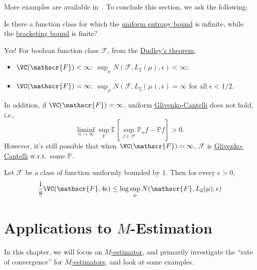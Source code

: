 More examples are available in~\cite{vandervaartWeakConvergenceEmpirical1996}. To conclude this section, we ask the following:

\begin{problem}
Is there a function class for which the \hyperref[thm:uniform-entropy-integral-bound]{uniform entropy bound} is infinite, while the \hyperref[thm:bracketing-bound]{bracketing bound} is finite?
\end{problem}
\begin{answer}
	Yes! For boolean function class \(\mathscr{F} \), from the \hyperref[thm:Dudley]{Dudley's theorem},
	\begin{itemize}
		\item \(\VC(\mathscr{F} ) < \infty \): \(\sup _\mu N(\mathscr{F} , L_2(\mu ), \epsilon ) < \infty\);
		\item \(\VC(\mathscr{F} ) = \infty \): \(\sup _\mu N(\mathscr{F} , L_2(\mu ), \epsilon ) = \infty \) for all \(\epsilon < 1 / 2\).
	\end{itemize}
	In addition, if \(\VC(\mathscr{F} ) = \infty \), uniform \hyperref[def:Glivenko-Cantelli]{Glivenko-Cantelli} does not hold, i.e.,
	\[
		\liminf_{n \to \infty} \sup _\mathbb{P} \mathbb{E}_{}\left[\sup _{f\in \mathscr{F} } \mathbb{P} _n f - \mathbb{P} f \right] > 0.
	\]
	However, it's still possible that when \(\VC(\mathscr{F} ) = \infty \), \(\mathscr{F} \) is \hyperref[def:Glivenko-Cantelli]{Glivenko-Cantelli} w.r.t.\ some \(\mathbb{P} \).
\end{answer}


\begin{lemma}
	Let \(\mathscr{F} \) be a class of function uniformly bounded by \(1\). Then for every \(\epsilon > 0\),
	\[
		\frac{1}{8}\VC(\mathscr{F} , 4\epsilon )
		\leq \log \sup _\mu N(\mathscr{F} , L_2(\mu ), \epsilon )
	\]
\end{lemma}

\chapter{Applications to \(M\)-Estimation}
In this chapter, we will focus on \hyperref[subsec:M-estimators]{\(M\)-estimator}, and primarily investigate the ``rate of convergence'' for \hyperref[subsec:M-estimators]{\(M\)-estimators}, and look at some examples.

